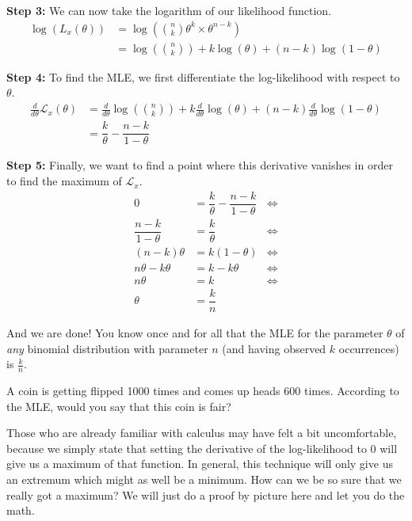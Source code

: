 \textbf{Step 3:} We can now take the logarithm of our likelihood function.
\begin{align}
\log(L_{x}(\theta)) &= \log\left(\binom{n}{k} \theta^{k} \times \theta^{n-k} \right) \\
&= \log \left(\binom{n}{k}\right) + k\log(\theta) + (n-k)\log(1-\theta)
\end{align}

\textbf{Step 4:} To find the MLE, we first differentiate the log-likelihood with respect to $ \theta $.
\begin{align}
\frac{d}{d \theta} \mathcal{L}_{x}(\theta)
&= \frac{d}{d \theta} \log \left(\binom{n}{k}\right) + k \frac{d}{d \theta} \log(\theta) + (n-k) \frac{d}{d \theta} \log(1-\theta) \\
&= \dfrac{k}{\theta} - \dfrac{n-k}{1-\theta}
\end{align}

\textbf{Step 5:} Finally, we want to find a point where this derivative vanishes in order to find the maximum of $ \mathcal{L}_{x} $.
\begin{align}
0 &= \dfrac{k}{\theta} - \dfrac{n-k}{1-\theta} &\Leftrightarrow \\
\dfrac{n-k}{1- \theta} &= \dfrac{k}{\theta} &\Leftrightarrow \\
(n-k) \theta &= k (1 - \theta) &\Leftrightarrow \\
n\theta- k\theta &= k - k \theta &\Leftrightarrow \\
n\theta&= k &\Leftrightarrow \\
\theta &= \dfrac{k}{n}
\end{align}

And we are done! You know once and for all that the MLE for the parameter $\theta$ of \emph{any} binomial distribution with parameter $n$ (and having observed $k$ occurrences) is $ \frac{k}{n} $.

\begin{Exercise}
A coin is getting flipped 1000 times and comes up heads 600 times. According to the MLE, would you say that this coin is fair?
\end{Exercise}

Those who are already familiar with calculus may have felt a bit uncomfortable, because we simply state that setting the derivative of the log-likelihood
to 0 will give us a maximum of that function. In general, this technique will only give us an extremum which might as well be a minimum. How can we be so sure that
we really got a maximum? We will just do a proof by picture here and let you do the math. 

